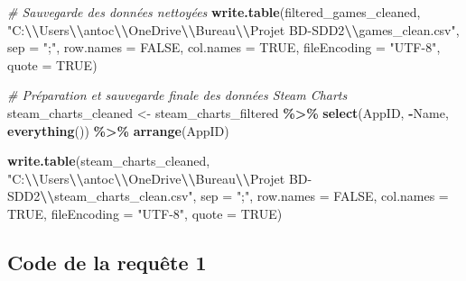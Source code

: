 \documentclass[mstat,12pt]{unswthesis}
\newenvironment{Shaded}{\begin{snugshade}}{\end{snugshade}}
\newcommand{\AttributeTok}[1]{\textcolor[rgb]{0.13,0.29,0.53}{#1}}
\newcommand{\CommentTok}[1]{\textcolor[rgb]{0.56,0.35,0.01}{\textit{#1}}}
\newcommand{\ConstantTok}[1]{\textcolor[rgb]{0.56,0.35,0.01}{#1}}
\newcommand{\FunctionTok}[1]{\textcolor[rgb]{0.13,0.29,0.53}{\textbf{#1}}}
\newcommand{\NormalTok}[1]{#1}
\newcommand{\OtherTok}[1]{\textcolor[rgb]{0.56,0.35,0.01}{#1}}
\newcommand{\SpecialCharTok}[1]{\textcolor[rgb]{0.81,0.36,0.00}{\textbf{#1}}}
\newcommand{\StringTok}[1]{\textcolor[rgb]{0.31,0.60,0.02}{#1}}
\begin{document}
\begin{Shaded}
\begin{Highlighting}[]
\CommentTok{\# Sauvegarde des données nettoyées}
\FunctionTok{write.table}\NormalTok{(filtered\_games\_cleaned, }
\StringTok{"C:}\SpecialCharTok{\textbackslash{}\textbackslash{}}\StringTok{Users}\SpecialCharTok{\textbackslash{}\textbackslash{}}\StringTok{antoc}\SpecialCharTok{\textbackslash{}\textbackslash{}}\StringTok{OneDrive}\SpecialCharTok{\textbackslash{}\textbackslash{}}\StringTok{Bureau}\SpecialCharTok{\textbackslash{}\textbackslash{}}\StringTok{Projet BD{-}SDD2}\SpecialCharTok{\textbackslash{}\textbackslash{}}\StringTok{games\_clean.csv"}\NormalTok{, }
    \AttributeTok{sep =} \StringTok{";"}\NormalTok{, }\AttributeTok{row.names =} \ConstantTok{FALSE}\NormalTok{, }\AttributeTok{col.names =} \ConstantTok{TRUE}\NormalTok{, }
    \AttributeTok{fileEncoding =} \StringTok{"UTF{-}8"}\NormalTok{, }\AttributeTok{quote =} \ConstantTok{TRUE}\NormalTok{)}

\CommentTok{\# Préparation et sauvegarde finale des données Steam Charts}
\NormalTok{steam\_charts\_cleaned }\OtherTok{\textless{}{-}}\NormalTok{ steam\_charts\_filtered }\SpecialCharTok{\%\textgreater{}\%}
  \FunctionTok{select}\NormalTok{(AppID, }\SpecialCharTok{{-}}\NormalTok{Name, }\FunctionTok{everything}\NormalTok{()) }\SpecialCharTok{\%\textgreater{}\%}
  \FunctionTok{arrange}\NormalTok{(AppID)}

\FunctionTok{write.table}\NormalTok{(steam\_charts\_cleaned, }
\StringTok{"C:}\SpecialCharTok{\textbackslash{}\textbackslash{}}\StringTok{Users}\SpecialCharTok{\textbackslash{}\textbackslash{}}\StringTok{antoc}\SpecialCharTok{\textbackslash{}\textbackslash{}}\StringTok{OneDrive}\SpecialCharTok{\textbackslash{}\textbackslash{}}\StringTok{Bureau}\SpecialCharTok{\textbackslash{}\textbackslash{}}\StringTok{Projet BD{-}SDD2}\SpecialCharTok{\textbackslash{}\textbackslash{}}\StringTok{steam\_charts\_clean.csv"}\NormalTok{,}
            \AttributeTok{sep =} \StringTok{";"}\NormalTok{, }\AttributeTok{row.names =} \ConstantTok{FALSE}\NormalTok{, }\AttributeTok{col.names =} \ConstantTok{TRUE}\NormalTok{,}
            \AttributeTok{fileEncoding =} \StringTok{"UTF{-}8"}\NormalTok{, }\AttributeTok{quote =} \ConstantTok{TRUE}\NormalTok{)}
\end{Highlighting}
\end{Shaded}

\hypertarget{code-de-la-requuxeate-1}{%
\subsection*{Code de la requête 1}\label{code-de-la-requuxeate-1}}
\end{document}
